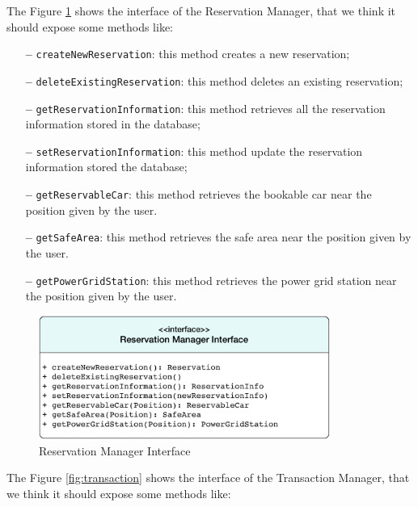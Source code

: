 \newline
The Figure \ref{fig:reservation} shows the interface of the Reservation Manager, that we think it should expose some methods like:

\begin{itemize}
\item[\textbf{--}] \texttt{createNewReservation}: this method creates a new reservation;
\item[\textbf{--}] \texttt{deleteExistingReservation}: this method deletes an existing reservation;
\item[\textbf{--}] \texttt{getReservationInformation}: this method retrieves all the reservation information stored in the database;
\item[\textbf{--}] \texttt{setReservationInformation}: this method update the reservation information stored the database;
\item[\textbf{--}] \texttt{getReservableCar}: this method retrieves the bookable car near the position given by the user.
\item[\textbf{--}] \texttt{getSafeArea}: this method retrieves the safe area near the position given by the user.
\item[\textbf{--}] \texttt{getPowerGridStation}: this method retrieves the power grid station near the position given by the user.
\end{itemize}

\begin{figure}[htbp]
\centering
\vspace{36pt}
\includegraphics[width=0.85\textwidth]{Images/ReservationManager.pdf}
\vspace{10pt}
\caption{Reservation Manager Interface}
\label{fig:reservation}
\end{figure}
\clearpage

\newline
The Figure \ref{fig:transaction} shows the interface of the Transaction Manager, that we think it should expose some methods like:

